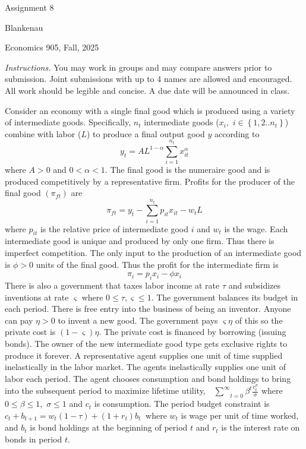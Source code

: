 \documentclass[11pt]{article}
\begin{document}
\begin{center}
{\LARGE Assignment 8}
\end{center}

\noindent Blankenau

\noindent Economics 905, Fall, 2025

\medskip
\noindent \noindent \textit{Instructions.} You may work in groups and may
compare answers prior to submission. Joint submissions with up to 4 names
are allowed and encouraged. All work should be legible and concise. A due
date will be announced in class.

Consider an economy with a single final good which is produced using a
variety of intermediate goods. Specifically, $n_{t}$ intermediate goods ($%
x_{i},$ $i\in \left\{ 1,2..n_{t}\right\} $) combine with labor ($L$) to
produce a final output good $y$ according to 
\begin{equation*}
y_{t}=AL^{1-\alpha }\overset{n_{t}}{\underset{i=1}{\sum }}x_{it}^{\alpha }
\end{equation*}%
where $A>0$ and $0<\alpha <1.$ The final good is the numeraire good and is
produced competitively by a representative firm. Profits for the producer of
the final good $\left( \pi _{ft}\right) $ are 
\begin{equation*}
\pi _{ft}=y_{t}-\overset{n_{t}}{\underset{i=1}{\sum }}p_{it}x_{it}-w_{t}L
\end{equation*}%
where $p_{it}$ is the relative price of intermediate good $i$ and $w_{t}$ is
the wage. Each intermediate good is unique and produced by only one firm.
Thus there is imperfect competition. The only input to the production of an
intermediate good is $\phi >0$ units of the final good. Thus the profit for
the intermediate firm is%
\begin{equation*}
\pi _{i}=p_{i}x_{i}-\phi x_{i}
\end{equation*}%
There is also a government that taxes labor income at rate $\tau $ and
subsidizes inventions at rate $\varsigma $ where $0\leq \tau ,\varsigma \leq
1.$ The government balances its budget in each period. There is free entry
into the business of being an inventor. Anyone can pay $\eta >0$ to invent a
new good. The government pays $\varsigma \eta $ of this so the private cost
is $\left( 1-\varsigma \right) \eta .$ The private cost is financed by
borrowing (issuing bonds). The owner of the new intermediate good type gets
exclusive rights to produce it forever. A representative agent supplies one
unit of time supplied inelastically in the labor market. The agents
inelastically supplies one unit of labor each period. The agent chooses
consumption and bond holdings to bring into the subsequent period to
maximize lifetime utility, $\underset{t=0}{\overset{\infty }{\text{ }\sum }}%
\beta ^{t}\frac{c_{t}^{\sigma }}{\sigma }$ where $0\leq \beta \leq 1,$ $%
\sigma \leq 1$ and $c_{t}$ is consumption$.$ The period budget constraint is 
$c_{t}+b_{t+1}=w_{t}\left( 1-\tau \right) +\left( 1+r_{t}\right) b_{t}\ $%
where $w_{t}$ is wage per unit of time worked, and $b_{t}$ is bond holdings
at the beginning of period $t$ and $r_{t}$ is the interest rate on bonds in
period $t$.
\end{document}
